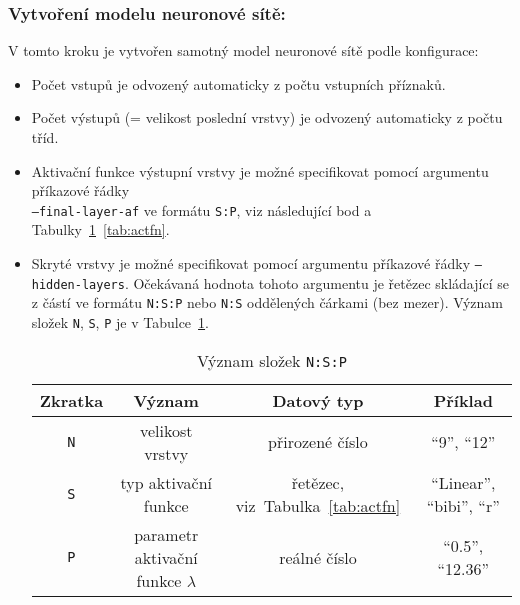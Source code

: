 \subsubsection*{Vytvoření modelu neuronové sítě:}
V tomto kroku je vytvořen samotný model neuronové sítě podle konfigurace:
\begin{itemize}[leftmargin=5mm]
	\item Počet vstupů je odvozený automaticky z počtu vstupních příznaků.
	\item Počet výstupů (= velikost poslední vrstvy) je odvozený automaticky z počtu tříd.
	\item Aktivační funkce výstupní vrstvy je možné specifikovat pomocí argumentu příkazové řádky\\
	      \texttt{--final-layer-af} ve formátu {\color{blue}\texttt{S:P}}, viz následující bod a Tabulky~\ref{tab:placeholders}~\ref{tab:actfn}.
	\item Skryté vrstvy je možné specifikovat pomocí argumentu příkazové řádky \texttt{--hidden-layers}.
	      Očekávaná hodnota tohoto argumentu je řetězec skládající se z částí ve formátu {\color{blue}\texttt{N:S:P}} nebo {\color{blue}\texttt{N:S}} oddělených čárkami (bez mezer).
	      Význam složek {\color{blue}\texttt{N}}, {\color{blue}\texttt{S}}, {\color{blue}\texttt{P}} je v Tabulce~\ref{tab:placeholders}.
	      \begin{table}[ht!]
		      \centering
		      \begin{tabular}{|c|c|c|c|}
			      \hline
			      \textbf{Zkratka}         & \textbf{Význam}                     & \textbf{Datový typ}                  & \textbf{Příklad}                              \\
			      \hline
			      {\color{blue}\texttt{N}} & velikost vrstvy                     & přirozené číslo                      & \enquote{9}, \enquote{12}                     \\
			      {\color{blue}\texttt{S}} & typ aktivační funkce                & řetězec, viz~Tabulka~\ref{tab:actfn} & \enquote{Linear}, \enquote{bibi}, \enquote{r} \\
			      {\color{blue}\texttt{P}} & parametr aktivační funkce $\lambda$ & reálné číslo                         & \enquote{0.5}, \enquote{12.36}                \\
			      \hline
		      \end{tabular}
		      \caption{Význam složek {\color{blue}\texttt{N:S:P}}}\label{tab:placeholders}
	      \end{table}
	      \begin{table}[ht!]

\end{table}
\end{itemize}
